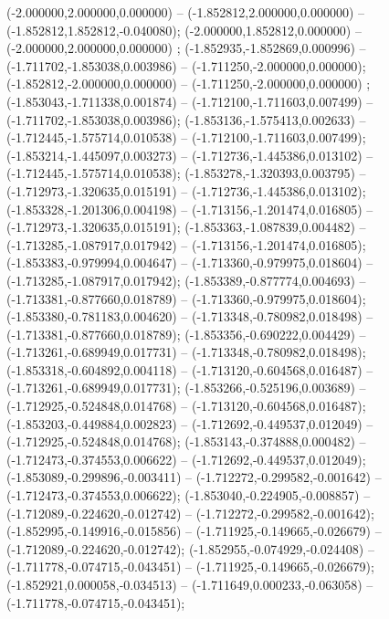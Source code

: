  (-2.000000,2.000000,0.000000) -- (-1.852812,2.000000,0.000000) -- (-1.852812,1.852812,-0.040080);
 (-2.000000,1.852812,0.000000) -- (-2.000000,2.000000,0.000000) ;
 (-1.852935,-1.852869,0.000996) -- (-1.711702,-1.853038,0.003986) -- (-1.711250,-2.000000,0.000000);
 (-1.852812,-2.000000,0.000000) -- (-1.711250,-2.000000,0.000000) ;
 (-1.853043,-1.711338,0.001874) -- (-1.712100,-1.711603,0.007499) -- (-1.711702,-1.853038,0.003986);
 (-1.853136,-1.575413,0.002633) -- (-1.712445,-1.575714,0.010538) -- (-1.712100,-1.711603,0.007499);
 (-1.853214,-1.445097,0.003273) -- (-1.712736,-1.445386,0.013102) -- (-1.712445,-1.575714,0.010538);
 (-1.853278,-1.320393,0.003795) -- (-1.712973,-1.320635,0.015191) -- (-1.712736,-1.445386,0.013102);
 (-1.853328,-1.201306,0.004198) -- (-1.713156,-1.201474,0.016805) -- (-1.712973,-1.320635,0.015191);
 (-1.853363,-1.087839,0.004482) -- (-1.713285,-1.087917,0.017942) -- (-1.713156,-1.201474,0.016805);
 (-1.853383,-0.979994,0.004647) -- (-1.713360,-0.979975,0.018604) -- (-1.713285,-1.087917,0.017942);
 (-1.853389,-0.877774,0.004693) -- (-1.713381,-0.877660,0.018789) -- (-1.713360,-0.979975,0.018604);
 (-1.853380,-0.781183,0.004620) -- (-1.713348,-0.780982,0.018498) -- (-1.713381,-0.877660,0.018789);
 (-1.853356,-0.690222,0.004429) -- (-1.713261,-0.689949,0.017731) -- (-1.713348,-0.780982,0.018498);
 (-1.853318,-0.604892,0.004118) -- (-1.713120,-0.604568,0.016487) -- (-1.713261,-0.689949,0.017731);
 (-1.853266,-0.525196,0.003689) -- (-1.712925,-0.524848,0.014768) -- (-1.713120,-0.604568,0.016487);
 (-1.853203,-0.449884,0.002823) -- (-1.712692,-0.449537,0.012049) -- (-1.712925,-0.524848,0.014768);
 (-1.853143,-0.374888,0.000482) -- (-1.712473,-0.374553,0.006622) -- (-1.712692,-0.449537,0.012049);
 (-1.853089,-0.299896,-0.003411) -- (-1.712272,-0.299582,-0.001642) -- (-1.712473,-0.374553,0.006622);
 (-1.853040,-0.224905,-0.008857) -- (-1.712089,-0.224620,-0.012742) -- (-1.712272,-0.299582,-0.001642);
 (-1.852995,-0.149916,-0.015856) -- (-1.711925,-0.149665,-0.026679) -- (-1.712089,-0.224620,-0.012742);
 (-1.852955,-0.074929,-0.024408) -- (-1.711778,-0.074715,-0.043451) -- (-1.711925,-0.149665,-0.026679);
 (-1.852921,0.000058,-0.034513) -- (-1.711649,0.000233,-0.063058) -- (-1.711778,-0.074715,-0.043451);
